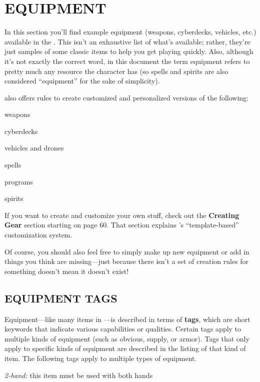 \documentclass[oneside,10pt]{article}
\begin{document}
\section{EQUIPMENT}
\begin{multicols}{2}
In this section you’ll find example equipment (weapons, cyberdecks, vehicles, etc.) available in the \SW{}. This isn’t
an exhaustive list of what’s available; rather, they’re just samples of some classic items to help you get playing quickly.
Also, although it’s not exactly the correct word, in this document the term equipment refers to pretty much any resource
the character has (so spells and spirits are also considered
“equipment” for the sake of simplicity).

\SW{} also offers rules to create customized
and personalized versions of the following:
\begin{adjustwidth*}{.5cm}{.5cm}

\tcirc{} weapons

\tcirc{} cyberdecks

\tcirc{} vehicles and drones

\tcirc{} spells

\tcirc{} programs

\tcirc{} spirits
\end{adjustwidth*}

If you want to create and customize your own stuff, check out
the \textbf{Creating Gear} section starting on page 60. That section explains \SW{}’s “template-based” customization
system.

Of course, you should also feel free to simply make up new
equipment or add in things you think are missing—just because there isn’t a set of creation rules for something doesn’t
mean it doesn’t exist!

\subsection{EQUIPMENT TAGS}
Equipment—like many items in \SW{}—is described in
terms of \textbf{tags}, which are short keywords that indicate various
capabilities or qualities. Certain tags apply to multiple kinds
of equipment (such as obvious, supply, or armor). Tags that
only apply to specific kinds of equipment are described in the
listing of that kind of item. The following tags apply to multiple types of equipment.
\begin{adjustwidth*}{.5cm}{.5cm}

\textit{2-hand:} this item must be used with both hands


\end{adjustwidth*}
\end{multicols}
\end{document}

